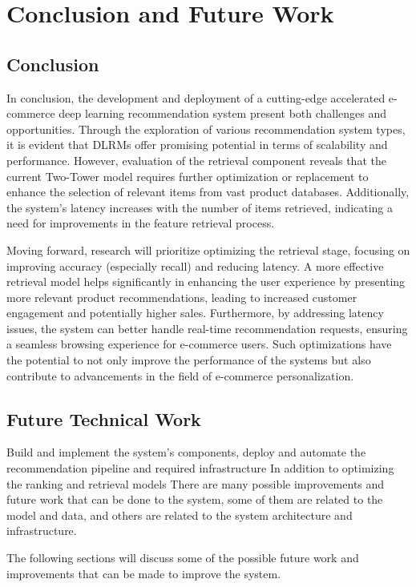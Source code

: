 \chapter{Conclusion and Future Work}
\minitoc

\section{Conclusion}

In conclusion, 
the development and deployment of a cutting-edge accelerated e-commerce deep learning recommendation system present both challenges and opportunities. 
Through the exploration of various recommendation system types, it is evident that DLRMs offer promising potential in terms of scalability and performance.
However, evaluation of the retrieval component reveals that the current Two-Tower model requires further optimization or replacement to enhance the selection of relevant items from vast product databases.
 Additionally, the system's latency increases with the number of items retrieved, indicating a need for improvements in the feature retrieval process.

 Moving forward, research will prioritize optimizing the retrieval stage, focusing on improving accuracy (especially recall) and reducing latency.
  A more effective retrieval model helps significantly in enhancing the user experience by presenting more relevant product recommendations, 
  leading to increased customer engagement and potentially higher sales. Furthermore, by addressing latency issues, the system can better handle real-time recommendation requests, ensuring a seamless browsing experience for e-commerce users. 
 Such optimizations have the potential to not only improve the performance of the systems but also contribute to advancements in the field of e-commerce personalization.

\section{Future Technical Work}
Build and implement the system's components, deploy and automate the recommendation pipeline and required infrastructure 
In addition to optimizing the ranking and retrieval models
There are many possible improvements and future work that can be done to the system, 
some of them are related to the model and data, and others are related to the system architecture and infrastructure.

The following sections will discuss some of the possible future work and improvements that can be made to improve the system.

